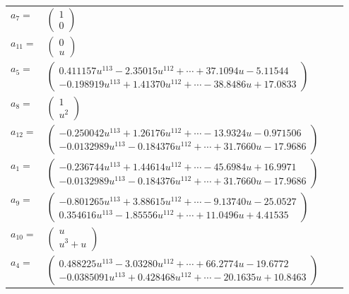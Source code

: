 \documentclass[1p]{elsarticle_modified}
\theoremstyle{definition}
\begin{document}
\begin{tabular}{m{7pt} m{180pt} m{7pt} m{180pt} }
\flushright $a_{7}=$&$\begin{pmatrix}1\\0\end{pmatrix}$ \\
\flushright $a_{11}=$&$\begin{pmatrix}0\\u\end{pmatrix}$ \\
\flushright $a_{5}=$&$\begin{pmatrix}0.411157 u^{113}-2.35015 u^{112}+\cdots+37.1094 u-5.11544\\-0.198919 u^{113}+1.41370 u^{112}+\cdots-38.8486 u+17.0833\end{pmatrix}$ \\
\flushright $a_{8}=$&$\begin{pmatrix}1\\u^2\end{pmatrix}$ \\
\flushright $a_{12}=$&$\begin{pmatrix}-0.250042 u^{113}+1.26176 u^{112}+\cdots-13.9324 u-0.971506\\-0.0132989 u^{113}-0.184376 u^{112}+\cdots+31.7660 u-17.9686\end{pmatrix}$ \\
\flushright $a_{1}=$&$\begin{pmatrix}-0.236744 u^{113}+1.44614 u^{112}+\cdots-45.6984 u+16.9971\\-0.0132989 u^{113}-0.184376 u^{112}+\cdots+31.7660 u-17.9686\end{pmatrix}$ \\
\flushright $a_{9}=$&$\begin{pmatrix}-0.801265 u^{113}+3.88615 u^{112}+\cdots-9.13740 u-25.0527\\0.354616 u^{113}-1.85556 u^{112}+\cdots+11.0496 u+4.41535\end{pmatrix}$ \\
\flushright $a_{10}=$&$\begin{pmatrix}u\\u^3+u\end{pmatrix}$ \\
\flushright $a_{4}=$&$\begin{pmatrix}0.488225 u^{113}-3.03280 u^{112}+\cdots+66.2774 u-19.6772\\-0.0385091 u^{113}+0.428468 u^{112}+\cdots-20.1635 u+10.8463\end{pmatrix}$ \\

\end{tabular}
\end{document}
